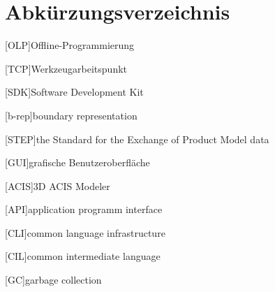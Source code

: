 \documentclass[14pt,a4paper,titlepage]{article}
\begin{document}
	\section*{Abkürzungsverzeichnis}
	\begin{acronym}[OLP]
		[OLP]{Offline-Programmierung}
	\end{acronym}
	\begin{acronym}[TCP]
		[TCP]{Werkzeugarbeitspunkt}
	\end{acronym}
	\begin{acronym}[SDK]
		[SDK]{Software Development Kit}
	\end{acronym}
	\begin{acronym}[b-rep]
		[b-rep]{boundary representation}
	\end{acronym}
	\begin{acronym}[step]
		{the Standard for the Exchange of Product Model data}
	\end{acronym}
	\begin{acronym}[gui]
		[GUI]{grafische Benutzeroberfläche}
	\end{acronym}
	\begin{acronym}[acis]
		{3D ACIS Modeler}
	\end{acronym}
	\begin{acronym}[api]
		[API]{application programm interface}
	\end{acronym}
	\begin{acronym}[cli]
		[CLI]{common language infrastructure}
	\end{acronym}
	\begin{acronym}[cil]
		[CIL]{common intermediate language}
	\end{acronym}
	\begin{acronym}[gc]
		[GC]{garbage collection}
	\end{acronym}
\end{document}
